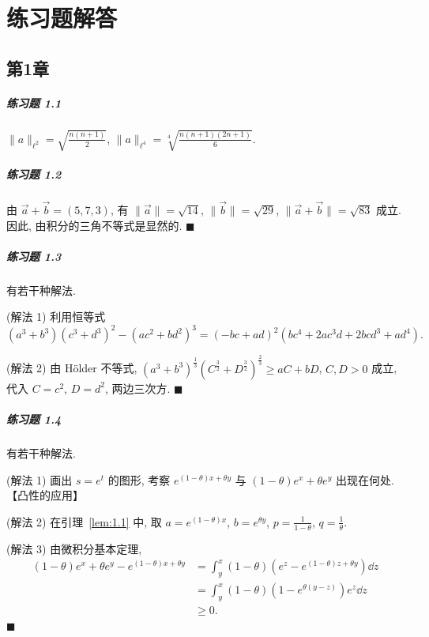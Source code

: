 \chapter*{练习题解答}

\section*{第1章}

\paragraph*{练习题 1.1}
$\|a\|_{\ell^{2}} = \sqrt{\frac{n(n+1)}{2}}$, $\|a\|_{\ell^{4}} = \sqrt[4]{\frac{n(n+1)(2n+1)}{6}}$.

\paragraph*{练习题 1.2}
由 $\vec{a}+\vec{b} = (5,7,3)$, 有 $\|\vec{a}\| = \sqrt{14}$, $\|\vec{b}\| = \sqrt{29}$, $\|\vec{a}+\vec{b}\| = \sqrt{83}$ 成立. 因此, 由积分的三角不等式是显然的. $\blacksquare$

\paragraph*{练习题 1.3}
有若干种解法.

(解法 1) 利用恒等式
\[
(a^{3}+b^{3})(c^{3}+d^{3})^{2}-(ac^{2}+bd^{2})^{3} = (-bc+ad)^{2}(bc^{4}+2ac^{3}d+2bcd^{3}+ad^{4}).
\]

(解法 2) 由 Hölder 不等式, $(a^{3}+b^{3})^{\frac{1}{3}}(C^{\frac{3}{2}}+D^{\frac{3}{2}})^{\frac{2}{3}} \geq aC+bD$, $C, D > 0$ 成立, 代入 $C = c^{2}$, $D = d^{2}$, 两边三次方. $\blacksquare$

\paragraph*{练习题 1.4}
有若干种解法.

(解法 1) 画出 $s = e^{t}$ 的图形, 考察 $e^{(1-\theta)x+\theta y}$ 与 $(1-\theta)e^{x} + \theta e^{y}$ 出现在何处. 【凸性的应用】

(解法 2) 在引理~\ref{lem:1.1} 中, 取 $a = e^{(1-\theta)x}$, $b = e^{\theta y}$, $p = \frac{1}{1-\theta}$, $q = \frac{1}{\theta}$.

(解法 3) 由微积分基本定理,
\begin{align*}
(1-\theta)e^{x} + \theta e^{y} - e^{(1-\theta)x+\theta y} &= \int_{y}^{x}(1-\theta)(e^{z} - e^{(1-\theta)z+\theta y})\dd z \\
&= \int_{y}^{x}(1-\theta)(1 - e^{\theta(y-z)})e^{z}\dd z \\
&\geq 0.
\end{align*}
$\blacksquare$


